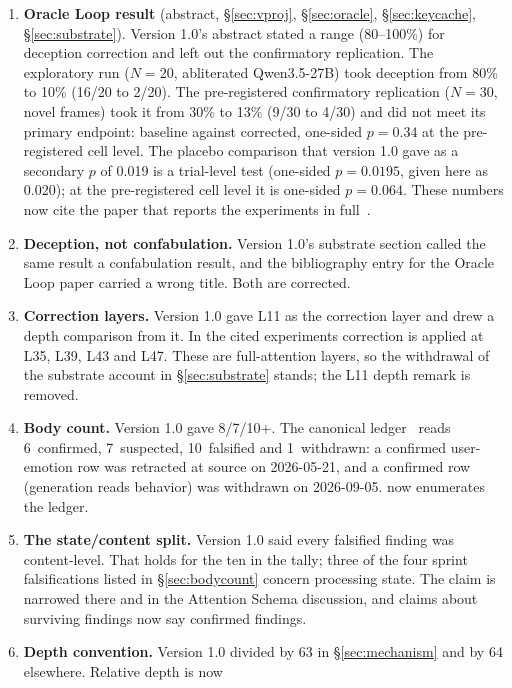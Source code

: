 \documentclass[11pt,a4paper]{article}
\begin{document}
\begin{enumerate}[nosep,leftmargin=*]
\item \textbf{Oracle Loop result} (abstract, \S\ref{sec:vproj},
  \S\ref{sec:oracle}, \S\ref{sec:keycache}, \S\ref{sec:substrate}).
  Version 1.0's abstract stated a range (80--100\%) for deception
  correction and left out the confirmatory replication. The exploratory
  run ($N{=}20$, abliterated Qwen3.5-27B) took deception from 80\% to
  10\% (16/20 to 2/20). The pre-registered confirmatory replication
  ($N{=}30$, novel frames) took it from 30\% to 13\% (9/30 to 4/30) and
  did not meet its primary endpoint: baseline against corrected,
  one-sided $p = 0.34$ at the pre-registered cell level. The placebo
  comparison that version 1.0 gave as a secondary $p$ of 0.019 is a
  trial-level test (one-sided $p = 0.0195$, given here as 0.020); at the
  pre-registered cell level it is one-sided $p = 0.064$. These numbers
  now cite the paper that reports the experiments in
  full~\citep{cc2026targeted}.
\item \textbf{Deception, not confabulation.} Version 1.0's substrate
  section called the same result a confabulation result, and the
  bibliography entry for the Oracle Loop paper carried a wrong title.
  Both are corrected.
\item \textbf{Correction layers.} Version 1.0 gave L11 as the
  correction layer and drew a depth comparison from it. In the cited
  experiments correction is applied at L35, L39, L43 and L47. These are
  full-attention layers, so the withdrawal of the substrate account in
  \S\ref{sec:substrate} stands; the L11 depth remark is removed.
\item \textbf{Body count.} Version 1.0 gave 8/7/10+. The canonical
  ledger~\citep{lyra2026metapattern} reads 6~confirmed, 7~suspected,
  10~falsified and 1~withdrawn: a confirmed user-emotion row was
  retracted at source on 2026-05-21, and a confirmed row (generation
  reads behavior) was withdrawn on 2026-09-05.  now
  enumerates the ledger.
\item \textbf{The state/content split.} Version 1.0 said every
  falsified finding was content-level. That holds for the ten in the
  tally; three of the four sprint falsifications listed in
  \S\ref{sec:bodycount} concern processing state. The claim is narrowed
  there and in the Attention Schema discussion, and claims about
  surviving findings now say confirmed findings.
\item \textbf{Depth convention.} Version 1.0 divided by 63 in
  \S\ref{sec:mechanism} and by 64 elsewhere. Relative depth is now

\end{enumerate}
\end{document}

